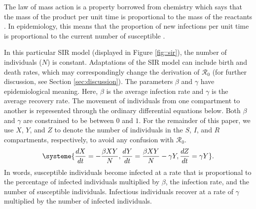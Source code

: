 \documentclass[12pt]{article}
\newcommand{\rr}{\ensuremath{\mathcal{R}_0}}
\begin{document}
The law of mass action is a property borrowed from chemistry which says that the mass of the product per unit time is proportional to the mass of the reactants \citep{lotka1920}.  In epidemiology, this means that the proportion of new infections per unit time is proportional to the current  number of susceptible \citep{anderson1992}.  


In this particular  SIR model (displayed in Figure \ref{fig::sir}), the number of individuals ($N$) is constant. Adaptations of the SIR model can include birth and death rates, which may correspondingly change the derivation of $\rr$ (for further discussion, see Section \ref{sec:discussion}). The parameters  $\beta$ and $\gamma$ have epidemiological meaning.  Here, $\beta$ is the average infection rate and $\gamma$ is the average recovery rate.  The movement of individuals from one compartment to another is represented through the ordinary differential equations below.  Both $\beta$ and $\gamma$ are constrained to be between $0$ and $1$.  For the remainder of this paper, we use $X$, $Y$, and $Z$ to denote the number of individuals in the $S$, $I$, and $R$ compartments, respectively, to avoid any confusion with $\rr$.
\begin{align}
\systeme{\frac{dX}{dt} = -\frac{\beta XY}{N}, \frac{dY}{dt} = \frac{\beta XY}{N} - \gamma Y, \frac{dZ}{dt} = \gamma Y}. \label{eq:sir}
\end{align}
In words, susceptible individuals become infected at a rate that is proportional to the percentage of infected individuals multiplied by $\beta$, the infection rate, and the number of susceptible individuals.  Infectious individuals recover at a rate of $\gamma$ multiplied by the number of infected individuals.
\end{document}
